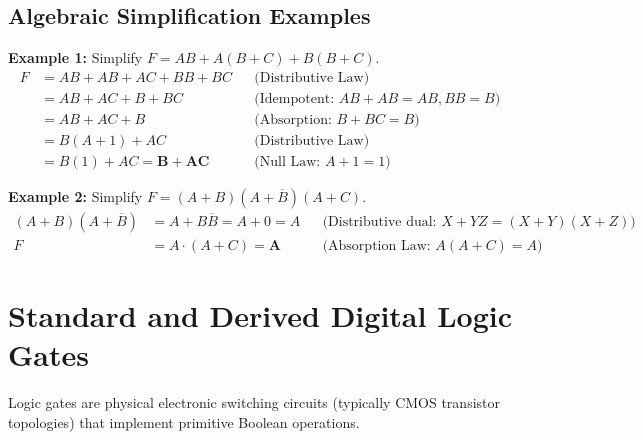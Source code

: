 \subsection{Algebraic Simplification Examples}
\textbf{Example 1:} Simplify $F = AB + A(B + C) + B(B + C)$.
\begin{align*}
F &= AB + AB + AC + BB + BC && \text{(Distributive Law)} \\
  &= AB + AC + B + BC && \text{(Idempotent: $AB+AB=AB, BB=B$)} \\
  &= AB + AC + B && \text{(Absorption: $B + BC = B$)} \\
  &= B(A + 1) + AC && \text{(Distributive Law)} \\
  &= B(1) + AC = \mathbf{B + AC} && \text{(Null Law: $A+1=1$)}
\end{align*}

\textbf{Example 2:} Simplify $F = (A + B)(A + \overline{B})(A + C)$.
\begin{align*}
(A + B)(A + \overline{B}) &= A + B\overline{B} = A + 0 = A && \text{(Distributive dual: $X+YZ = (X+Y)(X+Z)$)} \\
F &= A \cdot (A + C) = \mathbf{A} && \text{(Absorption Law: $A(A+C) = A$)}
\end{align*}


\section{Standard and Derived Digital Logic Gates}
\label{sec:logic_gates}

Logic gates are physical electronic switching circuits (typically CMOS transistor topologies) that implement primitive Boolean operations.


